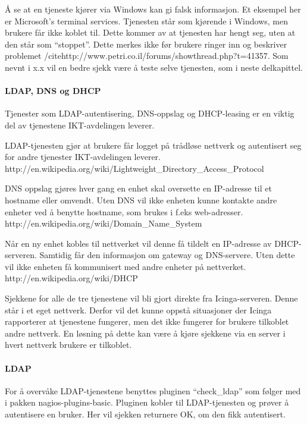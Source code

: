Å se at en tjeneste kjører via Windows kan gi falsk informasjon. Et eksempel her er Microsoft's terminal services. Tjenesten står som kjørende i Windows, men brukere får ikke koblet til. Dette kommer av at tjenesten har hengt seg, uten at den står som “stoppet”. Dette merkes ikke før brukere ringer inn og beskriver problemet /cite{http://www.petri.co.il/forums/showthread.php?t=41357}. Som nevnt i x.x vil en bedre sjekk være å teste selve tjenesten, som i neste delkapittel.

\paragraph{LDAP, DNS og DHCP}

Tjenester som LDAP-autentisering, DNS-oppslag og DHCP-leasing er en viktig del av tjenestene IKT-avdelingen leverer.

LDAP-tjenesten gjør at brukere får logget på trådløse nettverk og autentisert seg for andre tjenester IKT-avdelingen leverer. 
http://en.wikipedia.org/wiki/Lightweight\_Directory\_Access\_Protocol

DNS oppslag gjøres hver gang en enhet skal oversette en IP-adresse til et hostname eller omvendt. Uten DNS vil ikke enheten kunne kontakte andre enheter ved å benytte hostname, som brukes i f.eks web-adresser. 
http://en.wikipedia.org/wiki/Domain\_Name\_System

Når en ny enhet kobles til nettverket vil denne få tildelt en IP-adresse av DHCP-serveren. Samtidig får den informasjon om gateway og DNS-servere. Uten dette vil ikke enheten få kommunisert med andre enheter på nettverket. http://en.wikipedia.org/wiki/DHCP

Sjekkene for alle de tre tjenestene vil bli gjort direkte fra Icinga-serveren. Denne står i et eget nettverk. Derfor vil det kunne oppstå situasjoner der Icinga rapporterer at tjenestene fungerer, men det ikke fungerer for brukere tilkoblet andre nettverk. En løsning på dette kan være å kjøre sjekkene via en server i hvert nettverk brukere er tilkoblet.


\paragraph{LDAP}

For å overvåke LDAP-tjenestene benyttes pluginen “check\_ldap” som følger med i pakken nagios-plugins-basic. Pluginen kobler til LDAP-tjenesten og prøver å autentisere en bruker. Her vil sjekken returnere OK, om den fikk autentisert. 

